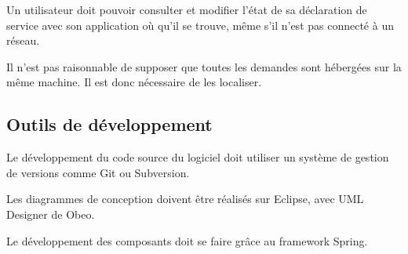 \begin{requirement}
	Un utilisateur doit pouvoir consulter et modifier l’état de sa déclaration de service avec son application où qu’il se trouve, même s'il n'est pas connecté à un réseau.
\end{requirement}

\begin{requirement}
Il n’est pas raisonnable de supposer que toutes les demandes sont hébergées sur la même machine. Il est donc nécessaire de les localiser.
\end{requirement}

\subsection{Outils de développement}

\begin{requirement}
	Le développement du code source du logiciel doit utiliser un système de gestion de versions comme Git ou Subversion.
\end{requirement}

\begin{requirement}
	Les diagrammes de conception doivent être réalisés sur Eclipse, avec UML Designer de Obeo.
\end{requirement}

\begin{requirement}[Spring]
	Le développement des composants doit se faire grâce au framework Spring.
\end{requirement}

\renewcommand{\listtheoremname}{Liste des exigences}

\listoftheorems[ignoreall,show={requirement}]

